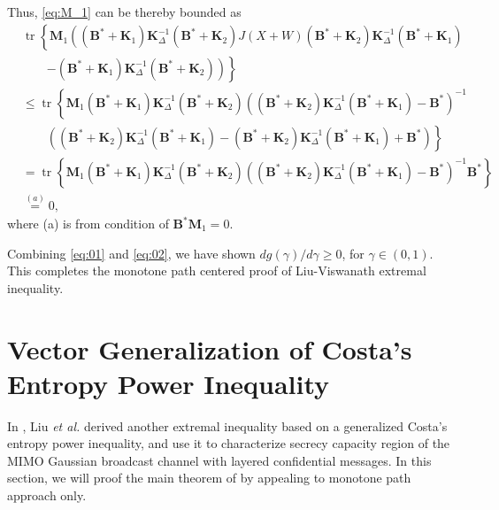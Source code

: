 \documentclass[journal,final, onecolumn]{IEEEtran}
\DeclareMathOperator{\tr}{tr}
\begin{document}
Thus, \eqref{eq:M_1} can be thereby bounded as
\begin{align}
&\tr \left\{  \boldsymbol{M}_{1} \left(      (\boldsymbol{B}^{*} + \boldsymbol{K}_{1}) \boldsymbol{K}^{-1}_{\Delta}(\boldsymbol{B}^{*} + \boldsymbol{K}_{2}) J(X+W)(\boldsymbol{B}^{*} + \boldsymbol{K}_{2}) \boldsymbol{K}^{-1}_{\Delta}(\boldsymbol{B}^{*} + \boldsymbol{K}_{1}) \right.\right.\nonumber \\
& \qquad \left.\left.  -(\boldsymbol{B}^{*} + \boldsymbol{K}_{1}) \boldsymbol{K}^{-1}_{\Delta}(\boldsymbol{B}^{*} + \boldsymbol{K}_{2})     \right)         \right\} \\
& \leq \tr \left\{    \boldsymbol{M}_{1}    (\boldsymbol{B}^{*} + \boldsymbol{K}_{1}) \boldsymbol{K}^{-1}_{\Delta}(\boldsymbol{B}^{*} + \boldsymbol{K}_{2})   \left( (\boldsymbol{B}^{*} + \boldsymbol{K}_{2}) \boldsymbol{K}^{-1}_{\Delta}(\boldsymbol{B}^{*} + \boldsymbol{K}_{1}) - \boldsymbol{B}^{*}\right)^{-1} \right.\nonumber \\
& \quad \quad \left.\left( (\boldsymbol{B}^{*} + \boldsymbol{K}_{2}) \boldsymbol{K}^{-1}_{\Delta}(\boldsymbol{B}^{*} + \boldsymbol{K}_{1})      -(\boldsymbol{B}^{*} + \boldsymbol{K}_{2}) \boldsymbol{K}^{-1}_{\Delta}(\boldsymbol{B}^{*} + \boldsymbol{K}_{1}) +\boldsymbol{B}^{*}  \right)       \right\} \\
& = \tr \left\{    \boldsymbol{M}_{1}    (\boldsymbol{B}^{*} + \boldsymbol{K}_{1}) \boldsymbol{K}^{-1}_{\Delta}(\boldsymbol{B}^{*} + \boldsymbol{K}_{2})   \left( (\boldsymbol{B}^{*} + \boldsymbol{K}_{2}) \boldsymbol{K}^{-1}_{\Delta}(\boldsymbol{B}^{*} + \boldsymbol{K}_{1}) - \boldsymbol{B}^{*}\right)^{-1} \boldsymbol{B}^{*}        \right\}\\
&\overset{(a)}=0, \label{eq:02}
\end{align}
where (a) is from condition of $\boldsymbol{B}^{*}  \boldsymbol{M}_1 =0$.

Combining \eqref{eq:01} and \eqref{eq:02}, we have shown $dg(\gamma)/d\gamma \geq 0$, for $\gamma \in (0,1)$. This completes the monotone path centered proof of Liu-Viswanath extremal inequality.


\section{Vector Generalization of Costa's Entropy Power Inequality}\label{sec3}
In \cite{LLPS13}, Liu \emph{et al.} derived another extremal inequality based on a generalized Costa's entropy power inequality, and use it to characterize secrecy capacity region of the MIMO Gaussian broadcast channel with layered confidential messages. In this section, we will proof the main theorem of \cite{LLPS13} by appealing to monotone path approach only.
\end{document}
